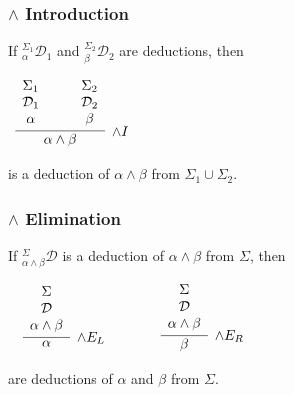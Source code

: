 \documentclass{beamer}
\theoremstyle{indentDefn} \newtheorem{defn}[]{Definition}
\begin{document}
\begin{frame}
	\frametitle{$\land$ Introduction}
	
	If $^{\Sigma_{1}}_{\alpha}\mathcal{D}_{1}$ and $^{\Sigma_{2}}_{\beta}\mathcal{D}_{2}$ are deductions, then

	\vspace{0.5cm}

	\begin{center}
		$\begin{array}{c}		
			\infer[\land I]{\alpha \land \beta}{\begin{array}{c} \Sigma_{1} \\ \mathcal{D}_{1} \\ \alpha \end{array} \quad & \begin{array}{c} \Sigma_{2} \\ \mathcal{D}_{2} \\ \beta \end{array}}	
		\end{array}$
	\end{center}

	is a deduction of $\alpha \land \beta$ from $\Sigma_{1} \cup \Sigma_{2}$. 
\end{frame}

\begin{frame}
	\frametitle{$\land$ Elimination}
	
	If $^{\Sigma}_{\alpha \land \beta}\mathcal{D}$ is a deduction of $\alpha \land \beta$ from $\Sigma$, then
	
	\begin{center}	
		
		$\begin{array}{ c c }		
		\begin{array}{c}		
			\infer[\land E_{L}]{\alpha}
			{\begin{array}{c} \Sigma \\ \mathcal{D} \\ \alpha \land \beta \end{array}}
		\end{array}
		
		\quad
		
		&
		
		\quad
		
		\begin{array}{c}		
			\infer[\land E_{R}]{\beta}
			{\begin{array}{c} \Sigma \\ \mathcal{D} \\ \alpha \land \beta \end{array}}
		\end{array}
		\end{array}$
	\end{center}
	
	are deductions of $\alpha$ and $\beta$ from $\Sigma$.
	
\end{frame}
\end{document}
